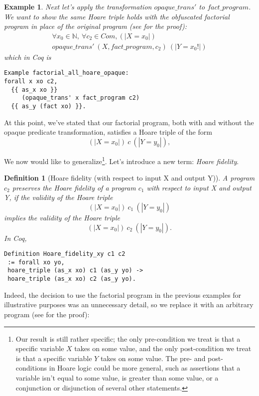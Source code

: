 \documentclass[compsoc,conference,a4paper,10pt,times]{IEEEtran}
\newtheorem{defin}[theorem]{Definition}
\newtheorem{example}[theorem]{Example}
\begin{document}
\begin{example}\label{hoarel2}
    Next let's apply the transformation $opaque\_trans'$ to $fact\_program$. We want to show the same Hoare triple holds with the obfuscated factorial program in place of the original program (see \cite{Weyun} for the proof):
    \[
    \begin{array}{c}
    \forall x_0 \in \mathbb{N},\ \forall c_2 \in Com, (|X=x_0|)\\ opaque\_trans'\ (X, fact\_program, c_2)\ (|Y=x_0!|)
    \end{array}
    \]
     \noindent    
    which in Coq is
\begin{verbatim}
Example factorial_all_hoare_opaque: 
forall x xo c2,
  {{ as_x xo }} 
     (opaque_trans' x fact_program c2) 
  {{ as_y (fact xo) }}.
\end{verbatim}
\end{example}

At this point, we've stated that our factorial program, both with and without the opaque predicate transformation, satisfies a Hoare triple of the form
\[ (| X = x_0 |)\ c\ (| Y = y_0 |), \]

We now would like to generalize\footnote{Our result is still rather specific; the only pre-condition we treat is that a specific variable $X$ takes on some value, and the only post-condition we treat is that a specific variable $Y$ takes on some value.  The pre- and post- conditions in Hoare logic could be more general, such as assertions that a variable isn't equal to some value, is greater than some value, or a conjunction or disjunction of several other statements.}.  Let's introduce a new term: \emph{Hoare fidelity}.
\par
\begin{defin}[Hoare fidelity (with respect to input X and output Y)]
A program $c_2$ preserves the Hoare fidelity of a program $c_1$ with respect to input X and output Y, if the validity of the Hoare triple
\[
(| X = x_0 |)\ c_1\ (| Y = y_0 |)
\]
implies the validity of the Hoare triple
\[
(| X = x_0 |)\ c_2\ (| Y = y_0 |).
\]
In Coq,
\begin{verbatim}
Definition Hoare_fidelity_xy c1 c2 
 := forall xo yo,
 hoare_triple (as_x xo) c1 (as_y yo) -> 
 hoare_triple (as_x xo) c2 (as_y yo).\end{verbatim}
\end{defin}

Indeed, the decision to use the factorial program in the previous examples for illustrative purposes was an unnecessary detail, so we replace it with an arbitrary program (see \cite{Weyun} for the proof): 
\end{document}
